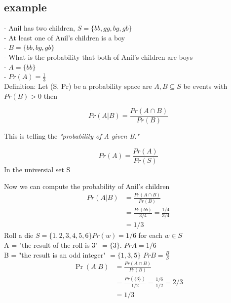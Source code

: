 \documentclass[a4paper,12pt]{article}
\begin{document}
\subsection{example}
  - Anil has two children, $S = \{bb,gg,bg,gb\}$\\
  - At least one of Anil's children is a boy\\
  - $B = \{bb,bg,gb\}$\\
  - What is the probability that both of Anil's children are boys\\
  - $A = \{bb\}$\\
  - $Pr(A) = \frac{1}{3}$\\ 
Definition: Let (S, Pr) be a probability space are $A, B \subseteq S$ 
be events with $Pr(B) > 0$ then 
\begin{center}
    $$Pr(A | B) = \frac{Pr(A \cap B)}{Pr(B)}$$
\end{center}
This is telling the \textit{"probability of A given B."} \\ 
\begin{center}
$$Pr(A) = \frac{Pr(A)}{Pr(S)}$$ In the universial set S
\end{center}
Now we can compute the probability of Anil's children 
\begin{align*}
    Pr(A | B) &= \frac{Pr(A \cap B)}{Pr(B)} \\ 
    &= \frac{Pr(bb)}{3/4}  = \frac{1/4}{3/4}\\
    &= 1/3 
\end{align*}
Roll a die $S = \{1,2,3,4,5,6\} Pr(w) = 1/6$ for each $w \in S$\\
A = "the result of the roll is 3" $= \{3\}$. $Pr{A} = 1/6$ \\
B = "the result is an odd integer" $= \{1,3,5\}$ $Pr{B} = \frac{B}{S}$ \\
\begin{align*}
    \Pr(A | B) &=  \frac{Pr(A \cap B)}{Pr(B)} \\ 
    &= \frac{Pr(\{3\})}{1/2} = \frac{1/6}{1/2} = 2/3 \\ 
    &= 1/3
\end{align*}
\end{document}
